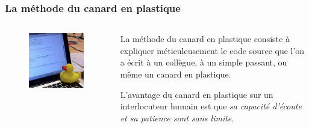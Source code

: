 \begin{frame}
\begin{columns}
\begin{column}{0.5\textwidth}
\begin{figure}
                \label{fig:book-clean-code}
            \end{figure}
        \end{column}
    \end{columns}
\end{frame}

\begin{frame}
    \frametitle{La méthode du canard en plastique}

    \begin{columns}
        \begin{column}{0.5\textwidth}
            \begin{figure}
                \centering
                \includegraphics[height=\linewidth]{figures/introduction/canard}
                \label{fig:canard}
            \end{figure}
        \end{column}
        \begin{column}{0.5\textwidth}
            La méthode du canard en plastique consiste à expliquer méticuleusement le code source que l'on a écrit
            à un collègue, à un simple passant, ou même un canard en plastique.

            \bigskip
            L'avantage du canard en plastique sur un interlocuteur humain est que
            \emph{sa capacité d'écoute et sa patience sont sans limite}.
        \end{column}
    \end{columns}
\end{frame}
